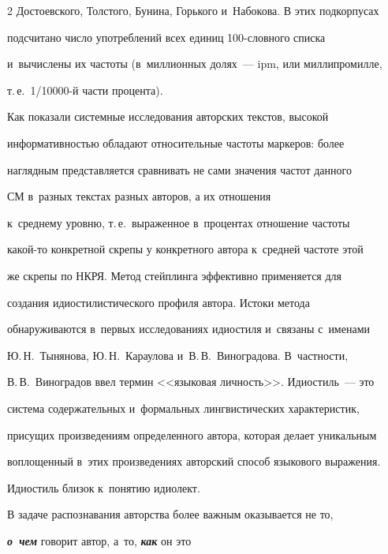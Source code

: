 \begin{multicols}{2}
Достоевского, Толстого, Бунина, Горького и~Набокова. В этих подкорпусах 


подсчитано чис\-ло употреблений всех единиц 100-слов\-но\-го списка 


и~вычислены их частоты (в~миллионных долях~--- ipm, или миллипромилле, 


т.\,е.\ 1/10000-й части процента). 


     


     Как показали системные исследования авторских текстов, высокой 


информативностью обладают относительные частоты маркеров: более 


наглядным представляется сравнивать не сами значения частот данного 


СМ в~разных текстах разных авторов, а их отношения 


к~среднему уровню, т.\,е.\ выраженное в~процентах отношение частоты  


ка\-кой-то конкретной скрепы у конкретного автора к~средней частоте этой 


же скрепы по НКРЯ. Метод стейплинга эффективно применяется для 


создания идиостилистического профиля автора. Истоки метода 


обнаруживаются в~первых исследованиях идиостиля и~связаны с~именами 


Ю.\,Н.~Тынянова, Ю.\,Н.~Караулова и~В.\,В.~Виноградова. В~част\-ности, 


В.\,В.~Виноградов ввел термин <<языковая личность>>. Идиостиль~--- это 


система содержательных и~формальных лингвистических характеристик, 


присущих произведениям определенного автора, которая делает уникальным 


воплощенный в~этих произведениях авторский способ языкового выражения. 


Идиостиль близок к~понятию идио\-лект. 


{





}


     


     В задаче распознавания авторства более важным оказывается не то, 


{\bfseries\textit{о~чем}} говорит автор, а~то, {\bfseries\textit{как}} он это 



\end{multicols}
